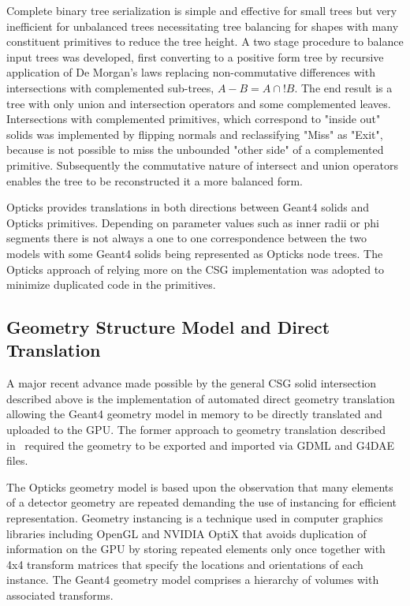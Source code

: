 \documentclass{webofc}
\begin{document}
Complete binary tree serialization is simple and effective for small trees but very inefficient 
for unbalanced trees necessitating tree balancing for shapes with many constituent primitives 
to reduce the tree height.  A two stage procedure to balance input trees was developed, 
first converting to a positive form tree by recursive application of De Morgan's laws replacing 
non-commutative differences with intersections with complemented sub-trees, $A - B  = A \cap !B $. 
The end result is a tree with only union and intersection operators and some complemented leaves. Intersections with 
complemented primitives, which correspond to "inside out" solids was implemented by flipping normals
and reclassifying "Miss" as "Exit", because is not possible to miss the unbounded "other side" of a 
complemented primitive.  Subsequently the commutative nature of intersect and union operators enables
the tree to be reconstructed it a more balanced form. 

Opticks provides translations in both directions between Geant4 solids and Opticks primitives.
Depending on parameter values such as inner radii or phi segments there is not always a one to one correspondence 
between the two models with some Geant4 solids being represented as Opticks node trees. The Opticks 
approach of relying more on the CSG implementation was adopted to minimize duplicated code in the primitives.
%
\subsection{Geometry Structure Model and Direct Translation}
%
A major recent advance made possible by the general CSG solid intersection 
described above is the implementation of automated direct geometry translation 
allowing the Geant4 geometry model in memory to be directly translated and uploaded to the GPU.
The former approach to geometry translation described in~\cite{chep2016} required the
geometry to be exported and imported via GDML and G4DAE files. 

The Opticks geometry model is based upon the observation that many elements of a detector 
geometry are repeated demanding the use of instancing for efficient representation.  Geometry instancing 
is a technique used in computer graphics libraries including OpenGL and NVIDIA OptiX that avoids 
duplication of information on the GPU by storing repeated elements only once together with 4x4 transform matrices 
that specify the locations and orientations of each instance.
The Geant4 geometry model comprises a hierarchy of volumes with associated transforms. 
\end{document}
